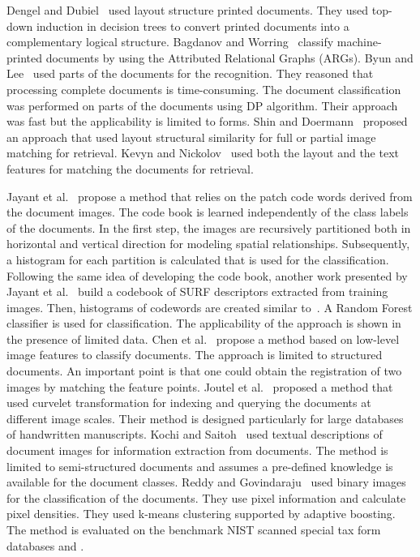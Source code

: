 \documentclass[conference]{IEEEtran}
\begin{document}
Dengel and Dubiel~\cite{doclass_Dengel95} used layout structure printed documents. They used top-down induction in decision trees to convert printed documents into a complementary logical structure.
Bagdanov and Worring~\cite{doclass_Bagdanov2001} classify machine-printed documents by using the Attributed Relational Graphs (ARGs).
Byun and Lee~\cite{doclass_Byun2000} used parts of the documents for the recognition. They reasoned that processing complete documents is time-consuming. The document classification was performed on parts of the documents using DP algorithm. Their approach was fast but the applicability is limited to forms. Shin and Doermann~\cite{doclass_shin} proposed an approach that used layout structural similarity for full or partial image matching for retrieval. 
Kevyn and Nickolov~\cite{Collins-thompson02aclustering-based} used both the layout and the text features for matching the documents for retrieval. 

Jayant et al.~\cite{doclass_Kumar12} propose a method that relies on the patch code words derived from the document images. The code book is learned independently of the class labels of the documents. In the first step, the images are recursively partitioned both in horizontal and vertical direction for modeling spatial relationships. Subsequently, a histogram for each partition is calculated that is used for the classification.
Following the same idea of developing the code book, another work presented by Jayant et al.~\cite{doclass_Kumar14} build a codebook of SURF descriptors extracted from training images. Then, histograms of codewords are created similar to~\cite{doclass_Kumar12}. A Random Forest classifier is used for classification. The applicability of the approach is shown in the presence of limited data.
Chen et al.~\cite{doclass_Chen12} propose a method based on low-level image features to classify documents. The approach is limited to structured documents. An important point is that one could obtain the registration of two images by matching the feature points.
Joutel et al.~\cite{doclass_Joutel2007} proposed a method that used curvelet transformation for indexing and querying the documents at different image scales. Their method is designed particularly for large databases of handwritten manuscripts. Kochi and Saitoh~\cite{doclass_Kochi99} used textual descriptions of document images for information extraction from documents. The method is limited to semi-structured documents and assumes a pre-defined knowledge is available for the document classes.
Reddy and Govindaraju~\cite{doclass_umamaheswara08} used binary images for the classification of the documents. They use pixel information and calculate pixel densities.  They used k-means clustering supported by adaptive boosting. The method is evaluated on the benchmark NIST scanned special tax form databases  and .
\end{document}

